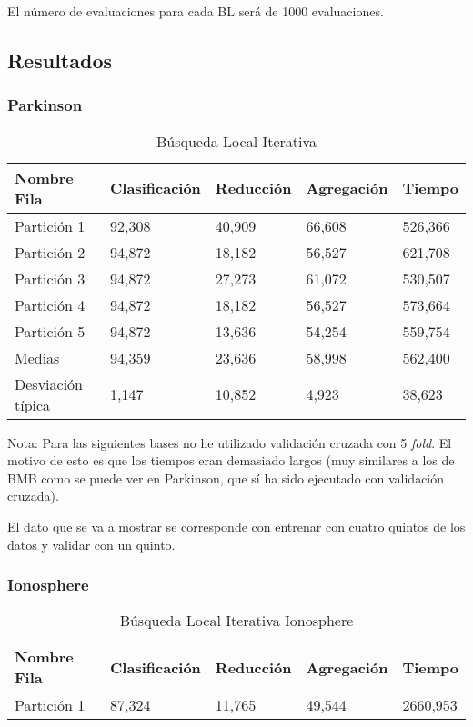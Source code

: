 El número de evaluaciones para cada BL será 
de 1000 evaluaciones. 

\subsection{Resultados}

\subsubsection{Parkinson}

\begin{table}[H]
    \centering
    \caption{Búsqueda Local Iterativa}
    \begin{tabular}{|l|l|l|l|l|}
    \hline
        Nombre Fila & Clasificación & Reducción & Agregación & Tiempo \\ \hline
        Partición 1 & 92,308 & 40,909 & 66,608 & 526,366 \\ \hline
        Partición 2 & 94,872 & 18,182 & 56,527 & 621,708 \\ \hline
        Partición 3 & 94,872 & 27,273 & 61,072 & 530,507 \\ \hline
        Partición 4 & 94,872 & 18,182 & 56,527 & 573,664 \\ \hline
        Partición 5 & 94,872 & 13,636 & 54,254 & 559,754 \\ \hline
        Medias  & 94,359 & 23,636 & 58,998 & 562,400 \\ \hline
        Desviación típica & 1,147 & 10,852 & 4,923 & 38,623 \\ \hline
    \end{tabular}
    \label{ILS-Parkinson}
\end{table}


Nota: Para las siguientes bases no he utilizado validación cruzada con 5 \textit{fold}. 
El motivo de esto es que los tiempos eran demasiado largos (muy similares a los de BMB como se puede ver en Parkinson, que sí ha sido ejecutado con validación cruzada). 

El dato que se va a mostrar se corresponde con 
entrenar con cuatro quintos de los datos y validar con un quinto. 


\subsubsection{Ionosphere}

\begin{table}[H]
    \centering
    \caption{Búsqueda Local Iterativa Ionosphere}
    \begin{tabular}{|l|l|l|l|l|}
    \hline
        Nombre Fila & Clasificación & Reducción & Agregación & Tiempo \\ \hline
        Partición 1  & 87,324 & 11,765 & 49,544 & 2660,953 \\ \hline
    \end{tabular}
    \label{ILS-Ionosphere}
\end{table}



